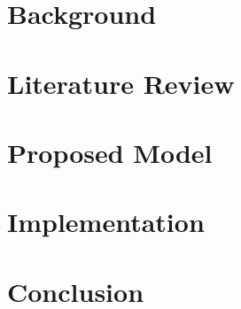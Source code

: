\documentclass[Times,12pt,oneside,openany,print,index]{report}
\begin{document}
\chapter{Background}


\chapter{Literature Review}


\chapter{Proposed Model}


\chapter{Implementation}


\chapter{Conclusion}




\printbibliography %

% 

% 
\end{document}
